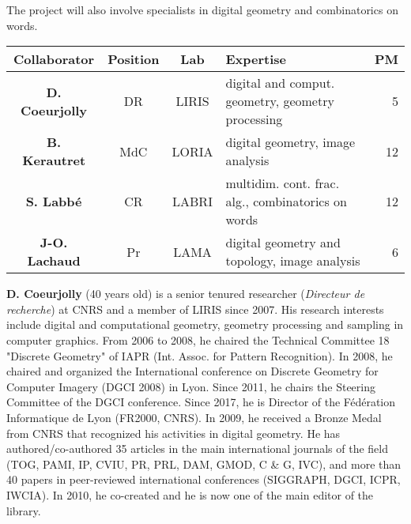 The project will also involve specialists in digital geometry and combinatorics on words.
\begin{table}[h]
\small
\centering
\begin{tabular}{|ccclr|}
\hline
Collaborator & Position & Lab & Expertise & PM\\ \hline
\hline
\textbf{D. Coeurjolly} & DR & LIRIS & digital and comput. geometry, geometry processing & 5 \\ \hline
\textbf{B. Kerautret} & MdC & LORIA & digital geometry, image analysis & 12 \\ \hline
\textbf{S. Labb\'{e}} & CR & LABRI & multidim. cont. frac. alg., combinatorics on words & 12 \\ \hline
\textbf{J-O. Lachaud} & Pr & LAMA & digital geometry and topology, image analysis & 6 \\ \hline
\hline
\end{tabular}
\normalsize
\end{table}


\textbf{D. Coeurjolly} (40 years old) is a senior tenured
  researcher (\emph{Directeur de recherche}) at CNRS and a member of
  LIRIS since 2007. His research interests include digital and
  computational geometry, geometry processing and sampling in computer
  graphics. From 2006 to 2008, he chaired the Technical Committee 18
  "Discrete Geometry" of IAPR (Int. Assoc. for Pattern
  Recognition). In 2008, he chaired and organized the International
  conference on Discrete Geometry for Computer Imagery (DGCI 2008) in
  Lyon. Since 2011, he chairs the Steering Committee of the DGCI
  conference. 
  Since 2017, he is Director of the Fédération Informatique de Lyon
  (FR2000, CNRS).
  In 2009, he received a Bronze Medal from CNRS that
  recognized his activities in digital geometry. He has
  authored/co-authored 35 articles in the main international journals
  of the field (\eg TOG, PAMI, IP, CVIU, PR, PRL, DAM, GMOD, C \& G,
  IVC), and more than 40 papers in peer-reviewed international
  conferences (\eg SIGGRAPH, DGCI, ICPR, IWCIA).
  In 2010, he co-created {\DGtal} and he is now one of
  the main editor of the library.


